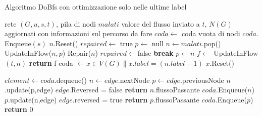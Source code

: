 \documentclass{article}
\begin{document}
\begin{algorithm}
    \caption{Algoritmo DoBfs con ottimizzazione solo nelle ultime label}
    \begin{algorithmic}
        \REQUIRE rete $(G,u,s,t)$, pila di nodi $malati$
        \ENSURE valore del flusso inviato a $t$, $N(G)$ aggiornati con informazioni sul percorso da fare
        \STATE $coda \leftarrow$ coda vuota di nodi
        \STATE $coda.$Enqueue$(s)$
        \STATE $n.$Reset()
        \ENDFOR
        \ELSE
        \STATE $repaired \leftarrow$ true
        \STATE $ p \leftarrow $ null
        \STATE $n \leftarrow malati.$pop()
        \STATE UpdateInFlow($n,p$) 
        \STATE Repair($n$)
        \STATE $repaired \leftarrow $false
        \STATE \textbf{break}
        \ENDIF
        \STATE $p \leftarrow n$
        \ENDWHILE
        \STATE $f \leftarrow $ UpdateInFlow $(t,n)$
        \STATE \textbf{return} f
        \ENDIF
        \STATE coda $\leftarrow x \in V(G) \|  x.label = (n.label - 1)$
        \STATE $x$.Reset()
        \ENDFOR
        \ENDIF
    \end{algorithmic}
\end{algorithm}
\newpage
\begin {algorithm}
\begin{algorithmic}
    \STATE $element  \leftarrow coda$.dequeue()
     
    \STATE $n \leftarrow edge.$nextNode
    \STATE $p \leftarrow edge$.previousNode
     
    \STATE $n$.update(p,edge) 
    \STATE $edge$.Reversed = false 
    \STATE \textbf{return} $n$.flussoPassante
    \ELSE
    \STATE $coda$.Enqueue($n$)
    \ENDIF
    \STATE $p$.update(n,edge)
    \STATE $edge$.reversed = true
    \STATE \textbf{return} $p$.flussoPassante
    \ELSE
    \STATE $coda$.Enqueue($p$)
    \ENDIF
    \ENDIF
    \ENDFOR
    \ENDIF
    \ENDWHILE
    \STATE \textbf{return} 0
\end{algorithmic}
\end{algorithm}
\end{document}
